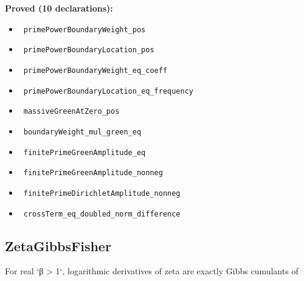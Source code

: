 \documentclass{report}
\theoremstyle{definition}
\begin{document}
\noindent\textbf{Proved (10 declarations):}
\begin{itemize}
  \item {}\leanok\ \texttt{primePowerBoundaryWeight\_pos}
  \item {}\leanok\ \texttt{primePowerBoundaryLocation\_pos}
  \item {}\leanok\ \texttt{primePowerBoundaryWeight\_eq\_coeff}
  \item {}\leanok\ \texttt{primePowerBoundaryLocation\_eq\_frequency}
  \item {}\leanok\ \texttt{massiveGreenAtZero\_pos}
  \item {}\leanok\ \texttt{boundaryWeight\_mul\_green\_eq}
  \item {}\leanok\ \texttt{finitePrimeGreenAmplitude\_eq}
  \item {}\leanok\ \texttt{finitePrimeGreenAmplitude\_nonneg}
  \item {}\leanok\ \texttt{finitePrimeDirichletAmplitude\_nonneg}
  \item {}\leanok\ \texttt{crossTerm\_eq\_doubled\_norm\_difference}
\end{itemize}

\subsection{ZetaGibbsFisher}
For real `β > 1`, logarithmic derivatives of zeta are exactly Gibbs cumulants of
\end{document}
